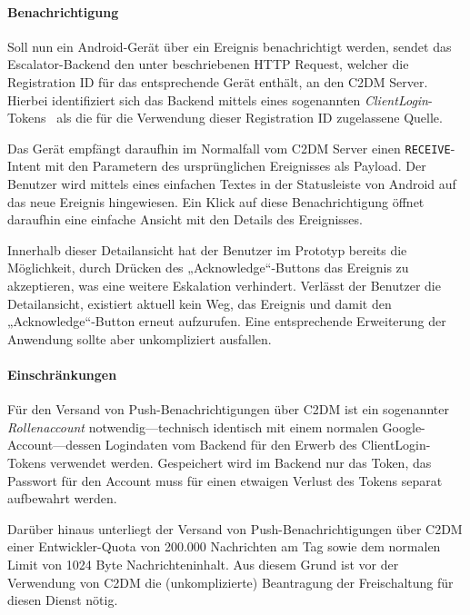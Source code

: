 \documentclass[11pt,utf8,notoc,bibnum,german,final]{zihpub}
\begin{document}
\paragraph{Benachrichtigung}
\label{android-notification}

Soll nun ein Android-Gerät über ein Ereignis benachrichtigt werden, sendet das
Escalator-Backend den unter \cite[\emph{How the Application Server Sends
Messages}]{c2dm} beschriebenen HTTP Request, welcher die Registration ID für
das entsprechende Gerät enthält, an den C2DM Server. Hierbei identifiziert sich
das Backend mittels eines sogenannten
\emph{ClientLogin}-Tokens~\cite{clientlogin} als die für die Verwendung dieser
Registration ID zugelassene Quelle.

Das Gerät empfängt daraufhin im Normalfall vom C2DM Server einen
\texttt{RECEIVE}-Intent mit den Parametern des ursprünglichen Ereignisses als
Payload. Der Benutzer wird mittels eines einfachen Textes in der Statusleiste
von Android auf das neue Ereignis hingewiesen. Ein Klick auf diese
Benachrichtigung öffnet daraufhin eine einfache Ansicht mit den Details des
Ereignisses.

Innerhalb dieser Detailansicht hat der Benutzer im Prototyp bereits die
Möglichkeit, durch Drücken des „Acknowledge“-Buttons das Ereignis zu
akzeptieren, was eine weitere Eskalation verhindert. Verlässt der Benutzer die
Detailansicht, existiert aktuell kein Weg, das Ereignis und damit den
„Acknowledge“-Button erneut aufzurufen. Eine entsprechende Erweiterung der
Anwendung sollte aber unkompliziert ausfallen.

\paragraph{Einschränkungen}

Für den Versand von Push-Benachrichtigungen über C2DM ist ein sogenannter
\emph{Rollenaccount} notwendig—technisch identisch mit einem normalen
Google-Account—dessen Logindaten vom Backend für den Erwerb des
ClientLogin-Tokens verwendet werden. Gespeichert wird im Backend nur das Token,
das Passwort für den Account muss für einen etwaigen Verlust des Tokens separat
aufbewahrt werden.

Darüber hinaus unterliegt der Versand von Push-Benachrichtigungen über C2DM
einer Entwickler-Quota von 200.000 Nachrichten am Tag sowie dem normalen Limit
von 1024 Byte Nachrichteninhalt. Aus diesem Grund ist vor der Verwendung von
C2DM die (unkomplizierte) Beantragung der Freischaltung für diesen Dienst
nötig.~\cite{c2dm-quotas}
\end{document}
